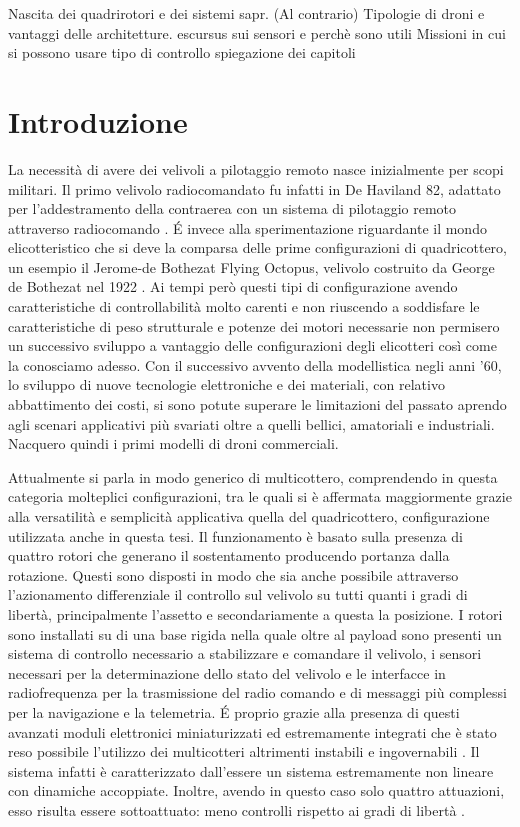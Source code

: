 \begin{scaletta}
	Nascita dei quadrirotori e dei sistemi sapr. (Al contrario)
	Tipologie di droni e vantaggi delle architetture. escursus sui sensori e perchè sono utili
	Missioni in cui si possono usare
	tipo di controllo
	spiegazione dei capitoli
\end{scaletta}
\chapter{Introduzione}
La necessità di avere dei velivoli a pilotaggio remoto nasce inizialmente per scopi militari. Il primo velivolo radiocomandato fu infatti in De Haviland 82, adattato per l'addestramento della contraerea con un sistema di pilotaggio remoto attraverso radiocomando \cite{histoDrone}. \'E invece alla sperimentazione riguardante il mondo elicotteristico che si deve la comparsa delle prime configurazioni di quadricottero, un esempio il Jerome-de Bothezat Flying Octopus, velivolo costruito da George de Bothezat nel 1922 \cite{Young}. Ai tempi però questi tipi di configurazione avendo caratteristiche di controllabilità molto carenti e non riuscendo a soddisfare le caratteristiche di peso strutturale e potenze dei motori necessarie non permisero un successivo sviluppo a vantaggio delle configurazioni degli elicotteri così come la conosciamo adesso. Con il successivo avvento della modellistica negli anni '60, lo sviluppo di nuove tecnologie elettroniche e dei materiali, con relativo abbattimento dei costi, si sono potute superare le limitazioni del passato aprendo agli scenari applicativi più svariati oltre a quelli bellici, amatoriali e industriali. Nacquero quindi i primi modelli di droni commerciali.

Attualmente si parla in modo generico di multicottero, comprendendo in questa categoria molteplici configurazioni, tra le quali si è affermata maggiormente grazie alla versatilità e semplicità applicativa quella del quadricottero, configurazione utilizzata anche in questa tesi. Il funzionamento è basato sulla presenza di quattro rotori che generano il sostentamento producendo portanza dalla rotazione. Questi sono disposti in modo che sia anche possibile attraverso l'azionamento differenziale il controllo sul velivolo su tutti quanti i gradi di libertà, principalmente l'assetto e secondariamente a questa la posizione. I rotori sono installati su di una base rigida nella quale oltre al payload sono presenti un sistema di controllo necessario a stabilizzare e comandare il velivolo, i sensori necessari per la determinazione dello stato del velivolo e le interfacce in radiofrequenza per la trasmissione del radio comando e di messaggi più complessi per la navigazione e la telemetria. \'E proprio grazie alla presenza di questi avanzati moduli elettronici miniaturizzati ed estremamente integrati che è stato reso possibile l'utilizzo dei multicotteri altrimenti instabili e ingovernabili \cite{multi2015}. Il sistema infatti è caratterizzato dall'essere un sistema estremamente non lineare con dinamiche accoppiate. Inoltre, avendo in questo caso solo quattro attuazioni, esso risulta essere sottoattuato: meno controlli rispetto ai gradi di libertà \cite{nonlinear2008}.

